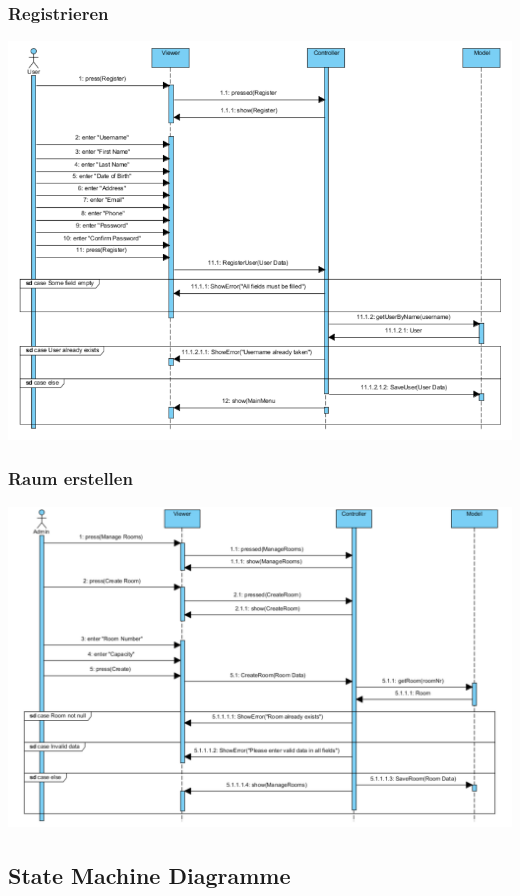 \documentclass[a4paper,12pt]{article}
\begin{document}
		\subsubsection*{Registrieren}
			\begin{center}
				\includegraphics[scale=.5]{SeqRegister.png}
			\end{center}
		\subsubsection*{Raum erstellen}
			\begin{center}
				\includegraphics[scale=.5]{SeqCreateRoom.png}
			\end{center}
	\subsection*{State Machine Diagramme}
\end{document}
